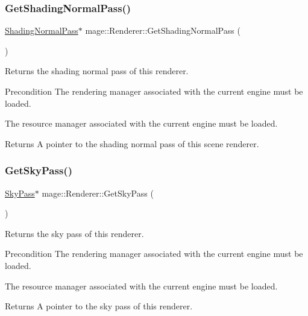 \subsubsection{\texorpdfstring{Get\+Shading\+Normal\+Pass()}{GetShadingNormalPass()}}
{\footnotesize\ttfamily \hyperlink{classmage_1_1_shading_normal_pass}{Shading\+Normal\+Pass}$\ast$ mage\+::\+Renderer\+::\+Get\+Shading\+Normal\+Pass (\begin{DoxyParamCaption}{ }\end{DoxyParamCaption})}

Returns the shading normal pass of this renderer.

\begin{DoxyPrecond}{Precondition}
The rendering manager associated with the current engine must be loaded. 

The resource manager associated with the current engine must be loaded. 
\end{DoxyPrecond}
\begin{DoxyReturn}{Returns}
A pointer to the shading normal pass of this scene renderer. 
\end{DoxyReturn}
\hypertarget{classmage_1_1_renderer_ad81ae84e11337dc699d4c6fb2d367e4d}{}\label{classmage_1_1_renderer_ad81ae84e11337dc699d4c6fb2d367e4d} 
\subsubsection{\texorpdfstring{Get\+Sky\+Pass()}{GetSkyPass()}}
{\footnotesize\ttfamily \hyperlink{classmage_1_1_sky_pass}{Sky\+Pass}$\ast$ mage\+::\+Renderer\+::\+Get\+Sky\+Pass (\begin{DoxyParamCaption}{ }\end{DoxyParamCaption})}

Returns the sky pass of this renderer.

\begin{DoxyPrecond}{Precondition}
The rendering manager associated with the current engine must be loaded. 

The resource manager associated with the current engine must be loaded. 
\end{DoxyPrecond}
\begin{DoxyReturn}{Returns}
A pointer to the sky pass of this renderer. 
\end{DoxyReturn}
\hypertarget{classmage_1_1_renderer_ada671ebf46487d88c326657a43184117}{}\label{classmage_1_1_renderer_ada671ebf46487d88c326657a43184117} 

